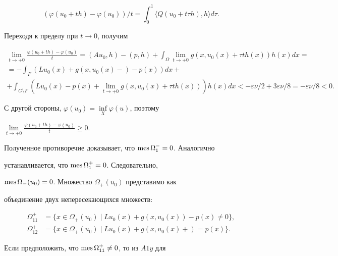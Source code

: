 $$


(\varphi(u_0+th)-\varphi(u_0))/t=


\int_0^1 \langle Q(u_0+t \tau h),h \rangle d \tau.


$$


Переходя к пределу при $t \to 0$, получим


\begin{multline*}


\lim\limits_{t\to+0} \frac{\varphi(u_0+th)-\varphi(u_0)}{t}=(Au_0,h)-(p,h)+


\int_\Omega \lim\limits_{t\to+0} g(x,u_0(x)+\tau th(x)) h(x) dx=\\


%


=-\int_F(Lu_0(x)+g(x,u_0(x)-)-p(x)) dx+ \\


%


+\int_{G \setminus F}(Lu_0(x)-p(x)+


\lim\limits_{t\to+0} g(x,u_0(x)+\tau th(x)))


h(x) dx < -\varepsilon\nu/2+3\varepsilon\nu/8=-\varepsilon\nu/8<0.


\end{multline*}


С другой стороны, $\varphi(u_0)=\inf\limits_X\varphi(u)$, поэтому


$\lim\limits_{t\to+0} \frac{\varphi(u_0+th)-\varphi(u_0)}{t}\ge0$.





Полученное противоречие доказывает, что $\operatorname{mes}\Omega_1^{-}=0$. Аналогично


устанавливается, что $\operatorname{mes}\Omega_1^{+}=0$. Следовательно,


$\operatorname{mes}\Omega_{-}(u_0)=0$. Множество $\Omega_{+}(u_0)$ представимо как


объединение двух непересекающихся множеств:


\begin{align*}


\Omega_{11}^+&=\{x \in \Omega_{+}(u_0)\mid Lu_0(x)+g(x,u_0(x))-p(x)\ne 0\},\\


\Omega_{12}^+&=\{x \in \Omega_{+}(u_0)\mid Lu_0(x)+g(x,u_0(x)+)=p(x)\}.


\end{align*}





Если предположить, что $\operatorname{mes}\Omega_{11}^+ \ne 0$, то из $A1y$ для


